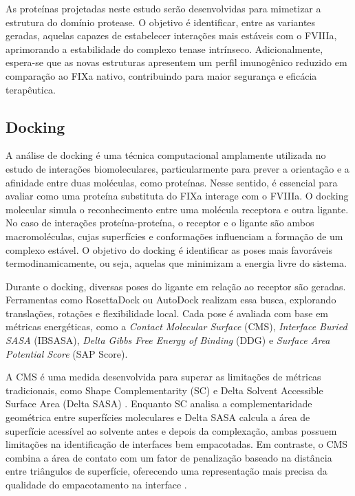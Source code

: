 As proteínas projetadas neste estudo serão desenvolvidas para mimetizar a estrutura do domínio protease.
O objetivo é identificar, entre as variantes geradas, aquelas capazes de estabelecer interações mais estáveis com o FVIIIa,
aprimorando a estabilidade do complexo tenase intrínseco. 
Adicionalmente, espera-se que as novas estruturas apresentem um perfil imunogênico reduzido em comparação ao FIXa nativo, 
contribuindo para maior segurança e eficácia terapêutica.

\subsection{Docking}
\label{subsection:Docking} 
A análise de docking é uma técnica computacional amplamente utilizada no estudo de interações biomoleculares,
particularmente para prever a orientação e a afinidade entre duas moléculas,
como proteínas. Nesse sentido, é essencial para avaliar como uma proteína substituta do FIXa interage com o FVIIIa. 
O docking molecular simula o reconhecimento entre uma molécula receptora e outra ligante. 
No caso de interações proteína-proteína, o receptor e o ligante são ambos macromoléculas,
cujas superfícies e conformações influenciam a formação de um complexo estável.
O objetivo do docking é identificar as poses mais favoráveis termodinamicamente, ou seja, 
aquelas que minimizam a energia livre do sistema.

Durante o docking, diversas poses do ligante em relação ao receptor são geradas.
Ferramentas como RosettaDock ou AutoDock realizam essa busca, explorando translações, rotações e flexibilidade local.
Cada pose é avaliada com base em métricas energéticas, como a \textit{Contact Molecular Surface} (CMS), \textit{Interface Buried SASA} (IBSASA),
\textit{Delta Gibbs Free Energy of Binding} (DDG) e \textit{Surface Area Potential Score} (SAP Score).

A CMS é uma medida desenvolvida para superar as limitações de métricas tradicionais, 
como Shape Complementarity (SC) e Delta Solvent Accessible Surface Area (Delta SASA) \cite{Docking}.
Enquanto SC analisa a complementaridade geométrica entre superfícies moleculares e 
Delta SASA calcula a área de superfície acessível ao solvente antes e depois da complexação,
ambas possuem limitações na identificação de interfaces bem empacotadas.
Em contraste, o CMS combina a área de contato com um fator de penalização baseado na distância entre triângulos de superfície,
oferecendo uma representação mais precisa da qualidade do empacotamento na interface \cite{Docking}.

